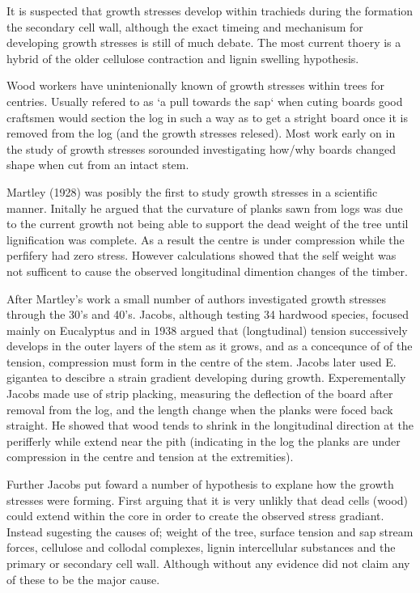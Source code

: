 \documentclass{article}
\begin{document}
It is suspected that growth stresses develop within trachieds during the
formation the secondary cell wall, although the exact timeing and mechanisum for
developing growth stresses is still of much debate. The most current thoery is
a hybrid of the older cellulose contraction and lignin swelling hypothesis.

Wood workers have unintenionally known of growth stresses within trees for
centries. Usually refered to as `a pull towards the sap` when cuting boards good
craftsmen would section the log in such a way as to get a stright board once it
is removed from the log (and the growth stresses relesed). Most work early on in
the study of growth stresses sorounded investigating how/why boards changed
shape when cut from an intact stem.

Martley (1928) was posibly the first to study growth stresses in a scientific
manner. Initally he argued that the curvature of planks sawn from logs was due
to the current growth not being able to support the dead weight of the tree until
lignification was complete. As a result the centre is under compression while
the perfifery had zero stress. However calculations showed that the self weight
was not sufficent to cause the observed longitudinal dimention changes of the
timber.

After Martley's work a small number of authors investigated growth stresses
through the 30's and 40's. Jacobs, although testing 34 hardwood species, focused
mainly on Eucalyptus and in 1938 argued that (longtudinal) tension successively develops in the outer layers of
the stem as it grows, and as a concequnce of of the tension, compression
must form in the centre of the stem. Jacobs later used E. gigantea to descibre a strain
gradient developing during growth. Experementally Jacobs made use of strip
placking, measuring the deflection of the board after removal from the log, and
the length change when the planks were foced back straight. He showed that wood tends to shrink in the
longitudinal direction at the perifferly while extend near the pith
(indicating in the log the planks are under compression in the centre and
tension at the extremities).

Further Jacobs put foward a number of hypothesis to explane how the growth
stresses were forming. First arguing that it is very unlikly that dead cells
(wood) could extend within the core in order to create the observed stress
gradiant. Instead sugesting the causes of; weight of the tree, surface tension
and sap stream forces, cellulose and collodal complexes, lignin intercellular
substances and the primary or secondary cell wall. Although without any evidence
did not claim any of these to be the major cause.
\end{document}
